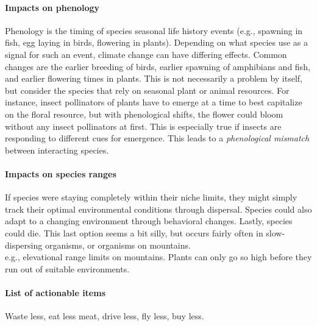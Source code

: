 \documentclass[12pt]{article}
\begin{document}
\paragraph*{Impacts on phenology}

Phenology is the timing of species seasonal life history events (e.g., spawning in fish, egg laying in birds, flowering in plants). Depending on what species use as a signal for such an event, climate change can have differing effects. Common changes are the earlier breeding of birds, earlier spawning of amphibians and fish, and earlier flowering times in plants. This is not necessarily a problem by itself, but consider the species that rely on seasonal plant or animal resources. For instance, insect pollinators of plants have to emerge at a time to best capitalize on the floral resource, but with phenological shifts, the flower could bloom without any insect pollinators at first. This is especially true if insects are responding to different cues for emergence. This leads to a \textit{phenological mismatch} between interacting species. 







\paragraph*{Impacts on species ranges}

If species were staying completely within their niche limits, they might simply track their optimal environmental conditions through dispersal. Species could also adapt to a changing environment through behavioral changes. Lastly, species could die. This last option seems a bit silly, but occurs fairly often in slow-dispersing organisms, or organisms on mountains. \\

e.g., elevational range limits on mountains. Plants can only go so high before they run out of suitable environments. 
















\bigskip
\paragraph*{List of actionable items}

Waste less, eat less meat, drive less, fly less, buy less. 
\end{document}
